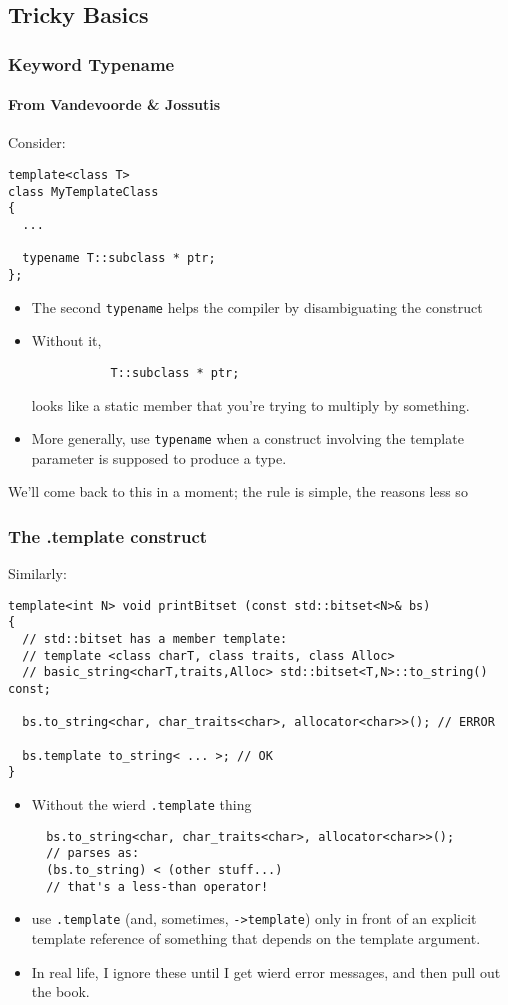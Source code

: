 \subsection[Tricky Basics]{Tricky Basics}

\begin{frame}[fragile,t]
\frametitle{Keyword Typename}
\framesubtitle{From Vandevoorde \& Jossutis}
Consider:

{\scriptsize
\begin{verbatim}
template<class T> 
class MyTemplateClass
{
  ...

  typename T::subclass * ptr;
};
\end{verbatim}
}
\begin{itemize}[<+->]
\item The second \texttt{typename} helps the compiler by
  disambiguating the construct
\item Without it, 
{\scriptsize
\begin{verbatim}
           T::subclass * ptr;
\end{verbatim}
}
looks like a static member that you're trying to multiply by something.
\item More generally, use \texttt{typename} when a construct involving
  the template parameter is supposed to produce a type.
\end{itemize}
\pause
\begin{center}
We'll come back to this in a moment; the rule is simple, the reasons
less so
\end{center}
\end{frame}


\begin{frame}[fragile,t]
\frametitle{The .template construct}
Similarly:
{\scriptsize
\begin{verbatim}
template<int N> void printBitset (const std::bitset<N>& bs)
{
  // std::bitset has a member template:
  // template <class charT, class traits, class Alloc>
  // basic_string<charT,traits,Alloc> std::bitset<T,N>::to_string() const;

  bs.to_string<char, char_traits<char>, allocator<char>>(); // ERROR

  bs.template to_string< ... >; // OK
}
\end{verbatim}
}
\begin{itemize}[<+->]
\item Without the wierd \texttt{.template} thing
{\scriptsize
\begin{verbatim}
  bs.to_string<char, char_traits<char>, allocator<char>>();
  // parses as:
  (bs.to_string) < (other stuff...)
  // that's a less-than operator!
\end{verbatim}
}
\item use \texttt{.template} (and, sometimes, \texttt{->template}) only
  in front of an explicit template reference of something that depends
  on the template argument.
\item In real life, I ignore these until I get wierd error messages, and
then pull out the book.

\end{itemize}
\end{frame}


